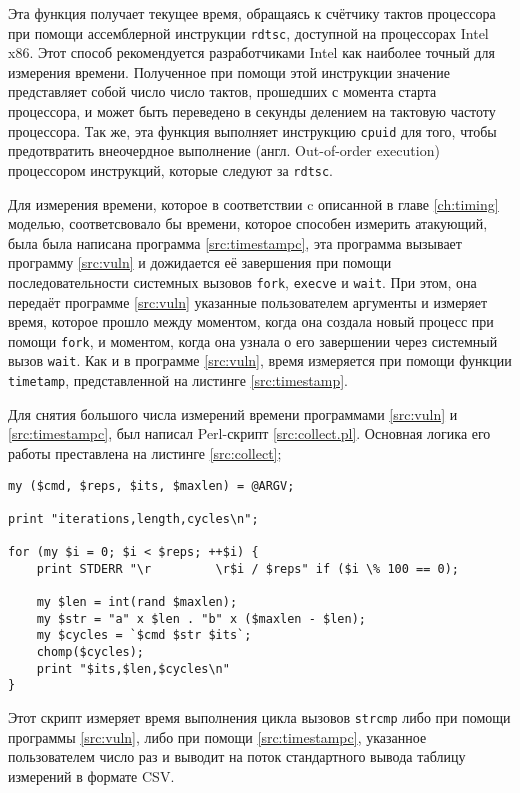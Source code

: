 Эта функция получает текущее время, обращаясь к счётчику тактов процессора при
помощи ассемблерной инструкции \texttt{rdtsc}, доступной на процессорах Intel x86.
Этот способ рекомендуется разработчиками Intel \cite{rdtsc} как наиболее точный для измерения
времени. Полученное при помощи этой инструкции значение представляет собой число
число тактов, прошедших с момента старта процессора, и может быть переведено в
секунды делением на тактовую частоту процессора. Так же, эта функция выполняет инструкцию
\texttt{cpuid} для того, чтобы предотвратить внеочердное выполнение
(англ. Out-of-order execution) процессором инструкций, которые следуют за \texttt{rdtsc}.

Для измерения времени, которое в соответствии c описанной в главе \ref{ch:timing}
моделью, соответсвовало бы времени, которое способен измерить атакующий, была
была написана программа \ref{src:timestampc}, эта программа вызывает программу
\ref{src:vuln} и дожидается её завершения при помощи последовательности системных
вызовов \texttt{fork}, \texttt{execve} и \texttt{wait}. При этом, она передаёт
программе \ref{src:vuln} указанные пользователем аргументы и измеряет время, которое
прошло между моментом, когда она создала новый процесс при помощи \texttt{fork},
и моментом, когда она узнала о его завершении через системный вызов \texttt{wait}.
Как и в программе \ref{src:vuln}, время измеряется при помощи функции \texttt{timetamp},
представленной на листинге \ref{src:timestamp}.

Для снятия большого числа измерений времени программами \ref{src:vuln} и
\ref{src:timestampc}, был написал Perl-скрипт \ref{src:collect.pl}. Основная логика его
работы преставлена на листинге \ref{src:collect};

\begin{lstlisting}
my ($cmd, $reps, $its, $maxlen) = @ARGV;

print "iterations,length,cycles\n";

for (my $i = 0; $i < $reps; ++$i) {
	print STDERR "\r         \r$i / $reps" if ($i \% 100 == 0);

	my $len = int(rand $maxlen);
	my $str = "a" x $len . "b" x ($maxlen - $len);
	my $cycles = `$cmd $str $its`;
	chomp($cycles);
	print "$its,$len,$cycles\n"
}
\end{lstlisting} \label{src:collect}

Этот скрипт измеряет время выполнения цикла вызовов \texttt{strcmp} либо при помощи
программы \ref{src:vuln}, либо при помощи \ref{src:timestampc}, указанное пользователем
число раз и выводит на поток стандартного вывода таблицу измерений в формате CSV.

